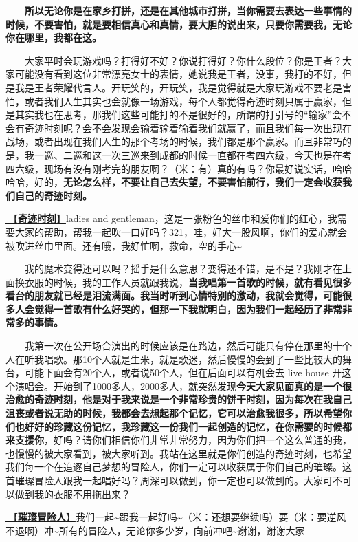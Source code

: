 \documentclass[]{ctexbook}
\begin{document}
  \textbf{所以无论你是在家乡打拼，还是在其他城市打拼，当你需要去表达一些事情的时候，不要害怕，就是要相信真心和真情，要大胆的说出来，只要你需要我，无论你在哪里，我都在这。}

  大家平时会玩游戏吗？打得好不好？你说打得好？你什么段位？你是王者？大家可能没有看到这位非常漂亮女士的表情，她说我是王者，没事，我打的不好，但是我是王者荣耀代言人。开玩笑的，开玩笑，我是觉得就是大家玩游戏不要老是害怕，或者我们人生其实也会就像一场游戏，每个人都觉得奇迹时刻只属于赢家，但是其实我也在思考，那我们这些可能打的不是很好的，所谓的打引号的``输家''会不会有奇迹时刻呢？会不会发现会输着输着输着我们就赢了，而且我们每一次出现在战场，或者出现在我们人生的那个考场的时候，我们都是那个赢家。而且非常巧的是，我一巡、二巡和这一次三巡来到成都的时候一直都在考四六级，今天也是在考四六级，现场有没有刚考完的朋友啊？（米：有）真的有吗？你最好说实话，哈哈哈哈，好的，\textbf{无论怎么样，不要让自己去失望，不要害怕前行，我们一定会收获我们自己的奇迹时刻。}

\hyperref[magic-moment]{🎵【\textbf{奇迹时刻}】}ladies and gentleman，这是一张粉色的丝巾和爱你们的红心，我需要大家的帮助，帮我一起吹一口好吗？321，哇，好大一股风啊，你们的爱心就会被吹进丝巾里面。还有哦，我好忙啊，救命，空的手心\textasciitilde{}

  我的魔术变得还可以吗？摇手是什么意思？变得还不错，是不是？我刚才在上面换衣服的时候，我的工作人员就跟我说，\textbf{当我唱第一首歌的时候，就有看见很多看台的朋友就已经是泪流满面。我当时听到心情特别的激动，我就会觉得，可能很多人会觉得一首歌有什么好哭的，但那一下我就明白，因为我们一起经历了非常非常多的事情。}

  我第一次在公开场合演出的时候应该是在路边，然后可能只有停在那里的十个人在听我唱歌。那10个人就是生米，就是歌迷，然后慢慢的会到了一些比较大的舞台，可能下面会有20个人，或者说50个人，但在后面可以有机会去 live house 开这个演唱会。开始到了1000多人，2000多人，就突然发现\textbf{今天大家见面真的是一个很治愈的奇迹时刻，他是对于我来说是一个非常珍贵的饼干时刻，因为每次在我自己沮丧或者说无助的时候，我都会去想起那个记忆，它可以治愈我很多，所以希望你们也好好的珍藏这份记忆，我珍藏这一份我们一起创造的记忆，在你需要的时候都来支援你}，好吗？请你们相信你们非常非常努力，因为你们把一个这么普通的我，也慢慢的被大家看到，被大家听到。我站在这里就是你们创造的奇迹时刻，也希望我们每一个在追逐自己梦想的冒险人，你们一定可以收获属于你们自己的璀璨。这首璀璨冒险人跟我一起唱好吗？周深可以做到，你一定也可以做到的。大家可不可以做到我的衣服不用拖出来？

\hyperref[adventurers]{🎵【\textbf{璀璨冒险人}】}我们一起\textasciitilde 跟我一起好吗\textasciitilde（米：还想要继续吗）要（米：要逆风不退啊）冲\textasciitilde 所有的冒险人，无论你多少岁，向前冲吧\textasciitilde 谢谢，谢谢大家
\end{document}

